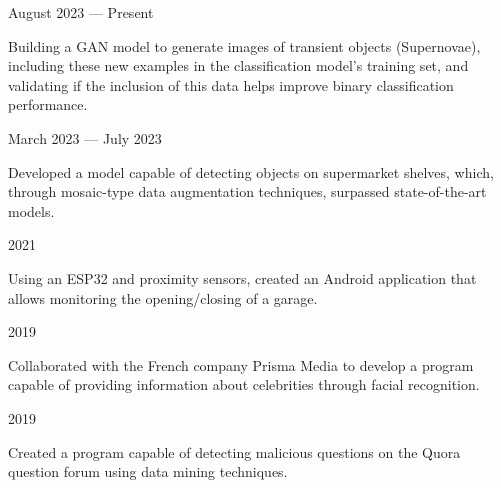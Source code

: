  \hfill August 2023 --- Present
\begin{zitemize}
\item Building a GAN model to generate images of transient objects (Supernovae), including these new examples in the classification model's training set, and validating if the inclusion of this data helps improve binary classification performance.
\end{zitemize}

 \hfill March 2023 --- July 2023
\begin{zitemize}
    \item Developed a model capable of detecting objects on supermarket shelves, which, through mosaic-type data augmentation techniques, surpassed state-of-the-art models.
\end{zitemize}

 \hfill 2021
\begin{zitemize}
    \item Using an ESP32 and proximity sensors, created an Android application that allows monitoring the opening/closing of a garage.
\end{zitemize}

 \hfill 2019
\begin{zitemize}
\item Collaborated with the French company Prisma Media to develop a program capable of providing information about celebrities through facial recognition.
\end{zitemize}

 \hfill 2019
\begin{zitemize}
\item Created a program capable of detecting malicious questions on the Quora question forum using data mining techniques.
\end{zitemize}

